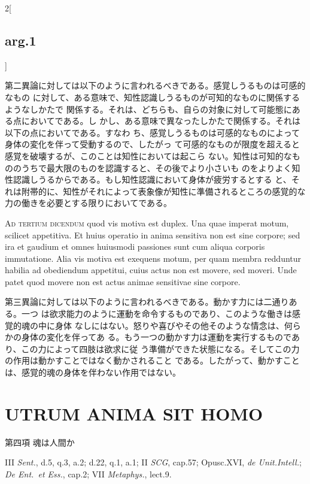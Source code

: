 \documentclass[paper=a4paper,fontsize=10pt,jafontsize=9pt,titlepage]{jlreq}
\begin{document}
\begin{paracol}{2}[\subsection{arg.1}]
\switchcolumn

 第二異論に対しては以下のように言われるべきである。感覚しうるものは可感的なもの
 に対して、ある意味で、知性認識しうるものが可知的なものに関係するようなしかたで
 関係する。それは、どちらも、自らの対象に対して可能態にある点においてである。し
 かし、ある意味で異なったしかたで関係する。それは以下の点においてである。すなわ
 ち、感覚しうるものは可感的なものによって身体の変化を伴って受動するので、したがっ
 て可感的なものが限度を超えると感覚を破壊するが、このことは知性においては起こら
 ない。知性は可知的なもののうちで最大限のものを認識すると、その後でより小さいも
 のをよりよく知性認識しうるからである。もし知性認識において身体が疲労するとする
 と、それは附帯的に、知性がそれによって表象像が知性に準備されるところの感覚的な
 力の働きを必要とする限りにおいてである。

\switchcolumn*[\subsection{ad 3}]

 {\scshape Ad tertium dicendum} quod vis motiva est duplex. Una quae imperat
 motum, scilicet appetitiva. Et huius operatio in anima sensitiva non est sine
 corpore; sed ira et gaudium et omnes huiusmodi passiones sunt cum aliqua
 corporis immutatione. Alia vis motiva est exequens motum, per quam membra
 redduntur habilia ad obediendum appetitui, cuius actus non est movere, sed
 moveri. Unde patet quod movere non est actus animae sensitivae sine corpore.

\switchcolumn

 第三異論に対しては以下のように言われるべきである。動かす力には二通りある。一つ
 は欲求能力のように運動を命令するものであり、このような働きは感覚的魂の中に身体
 なしにはない。怒りや喜びやその他そのような情念は、何らかの身体の変化を伴ってあ
 る。もう一つの動かす力は運動を実行するものであり、この力によって四肢は欲求に従
 う準備ができた状態になる。そしてこの力の作用は動かすことではなく動かされること
 である。したがって、動かすことは、感覚的魂の身体を伴わない作用ではない。

\end{paracol}
\newpage

\section{UTRUM ANIMA SIT HOMO}

{\Large 第四項 魂は人間か}

{\footnotesize III {\itshape Sent.}, d.5, q.3, a.2; d.22, q.1, a.1; II
 {\itshape SCG}, cap.57; Opusc.XVI, {\itshape de Unit.Intell.};
 {\itshape De Ent.~et Ess.}, cap.2; VII {\itshape Metaphys.}, lect.9.}\\
\end{document}
